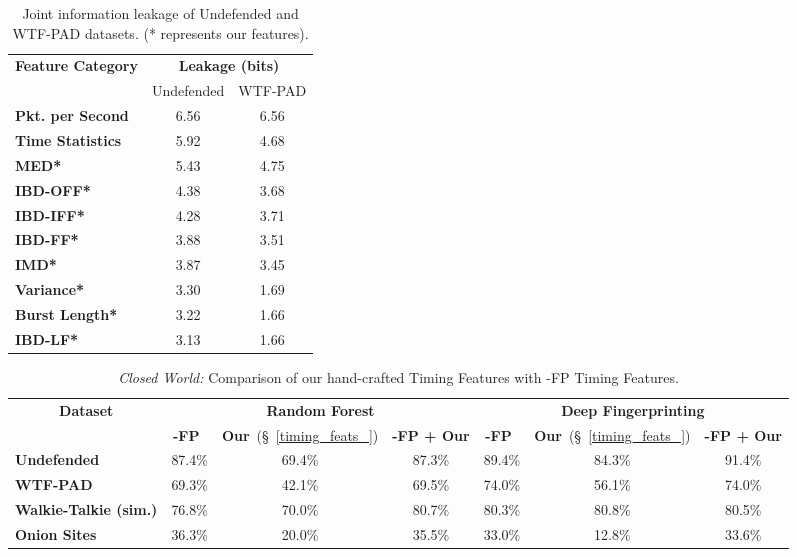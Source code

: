 \documentclass[USenglish,oneside,twocolumn]{article}
\begin{document}
\begin{table}[tbp]
\renewcommand{\arraystretch}{1.2}
  \begin{center}
      \caption{Joint information leakage of Undefended and WTF-PAD datasets. (* represents our features).}\vskip -0.2cm
    \label{tab:jointleak}
    \begin{tabular}{l c c}
\multirow{2}{*}{\textbf{Feature Category}} & \multicolumn{2}{c}{\textbf{Leakage (bits)}} \\ \cline{2-3}
    & Undefended & WTF-PAD \\
    \hline \textbf{Pkt. per Second} & 6.56 & 6.56\\
        \textbf{Time Statistics} & 5.92 & 4.68\\
        \textbf{MED*} & 5.43 & 4.75\\
        \textbf{IBD-OFF*} & 4.38 & 3.68\\
        \textbf{IBD-IFF*} & 4.28 & 3.71\\
        \textbf{IBD-FF*} & 3.88 & 3.51\\
        \textbf{IMD*} & 3.87 & 3.45\\
        \textbf{Variance*} & 3.30 & 1.69\\
        \textbf{Burst Length*} & 3.22 & 1.66\\
        \textbf{IBD-LF*} & 3.13 & 1.66\\

    \hline \end{tabular}
  \end{center}
\end{table} 
\begin{table*}[th!]
\renewcommand{\arraystretch}{1.25}
  \begin{center}\vskip -0.3cm
      \caption{{\em Closed World:} Comparison of our hand-crafted Timing Features with -FP Timing Features. }
\vskip -0.2cm
    \label{tab:cw_k_fp}
    \begin{tabular}{l c c c | c c c}


    \multicolumn{1}{c}{\multirow{2}{*}{\textbf{Dataset}}}           & \multicolumn{3}{c|}{\textbf{Random Forest}} & \multicolumn{3}{c}{\textbf{Deep Fingerprinting}} \\ \cline{2-7}
    
     & \textbf{-FP}~\cite{hayes2016k} & \textbf{Our}~(\S~\ref{timing_feats_}) & \textbf{-FP + Our} &  \textbf{-FP}~\cite{hayes2016k} & \textbf{Our}~(\S~\ref{timing_feats_}) & \textbf{-FP + Our}\\
    \hline \textbf{Undefended} & 87.4\% & 69.4\%  & 87.3\%  & 89.4\% & 84.3\% & 91.4\% \\
\textbf{WTF-PAD}  & 69.3\% & 42.1\%  & 69.5\%  & 74.0\% & 56.1\% & 74.0\% \\
\textbf{Walkie-Talkie (sim.)}  & 76.8\% & 70.0\%  & 80.7\%  & 80.3\% & 80.8\% & 80.5\% \\
\textbf{Onion Sites}  & 36.3\% &  20.0\%  & 35.5\%  & 33.0\% & 12.8\% & 33.6\% \\
    \hline \end{tabular}\vskip -0.3cm
  \end{center}
\end{table*}
\end{document}
